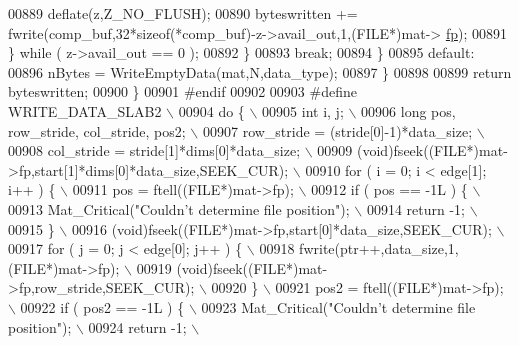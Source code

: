 \begin{DoxyCode}
{{{{00889                     deflate(z,Z\_NO\_FLUSH);
00890                     byteswritten += fwrite(comp\_buf,32*\textcolor{keyword}{sizeof}(*comp\_buf)-z->avail\_out,1,(FILE*)mat->
      \hyperlink{struct__mat__t_a85f562e407ca9ad4d2a6e14f839432b7}{fp});
00891                 \} \textcolor{keywordflow}{while} ( z->avail\_out == 0 );
00892             \}
00893             \textcolor{keywordflow}{break};
00894         \}
00895         \textcolor{keywordflow}{default}:
00896             nBytes = WriteEmptyData(mat,N,data\_type);
00897     \}
00898 
00899     \textcolor{keywordflow}{return} byteswritten;
00900 \}
00901 \textcolor{preprocessor}{#endif}
00902 
00903 \textcolor{preprocessor}{#define WRITE\_DATA\_SLAB2 \(\backslash\)}
00904 \textcolor{preprocessor}{    do \{ \(\backslash\)}
00905 \textcolor{preprocessor}{        int i, j; \(\backslash\)}
00906 \textcolor{preprocessor}{        long pos, row\_stride, col\_stride, pos2; \(\backslash\)}
00907 \textcolor{preprocessor}{        row\_stride = (stride[0]-1)*data\_size; \(\backslash\)}
00908 \textcolor{preprocessor}{        col\_stride = stride[1]*dims[0]*data\_size; \(\backslash\)}
00909 \textcolor{preprocessor}{        (void)fseek((FILE*)mat->fp,start[1]*dims[0]*data\_size,SEEK\_CUR); \(\backslash\)}
00910 \textcolor{preprocessor}{        for ( i = 0; i < edge[1]; i++ ) \{ \(\backslash\)}
00911 \textcolor{preprocessor}{            pos = ftell((FILE*)mat->fp); \(\backslash\)}
00912 \textcolor{preprocessor}{            if ( pos == -1L ) \{ \(\backslash\)}
00913 \textcolor{preprocessor}{                Mat\_Critical("Couldn't determine file position"); \(\backslash\)}
00914 \textcolor{preprocessor}{                return -1; \(\backslash\)}
00915 \textcolor{preprocessor}{            \} \(\backslash\)}
00916 \textcolor{preprocessor}{            (void)fseek((FILE*)mat->fp,start[0]*data\_size,SEEK\_CUR); \(\backslash\)}
00917 \textcolor{preprocessor}{            for ( j = 0; j < edge[0]; j++ ) \{ \(\backslash\)}
00918 \textcolor{preprocessor}{                fwrite(ptr++,data\_size,1,(FILE*)mat->fp); \(\backslash\)}
00919 \textcolor{preprocessor}{                (void)fseek((FILE*)mat->fp,row\_stride,SEEK\_CUR); \(\backslash\)}
00920 \textcolor{preprocessor}{            \} \(\backslash\)}
00921 \textcolor{preprocessor}{            pos2 = ftell((FILE*)mat->fp); \(\backslash\)}
00922 \textcolor{preprocessor}{            if ( pos2 == -1L ) \{ \(\backslash\)}
00923 \textcolor{preprocessor}{                Mat\_Critical("Couldn't determine file position"); \(\backslash\)}
00924 \textcolor{preprocessor}{                return -1; \(\backslash\)}
}}}}
\end{DoxyCode}
